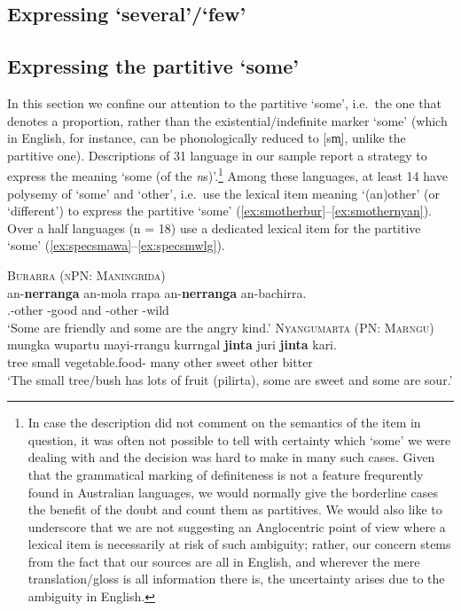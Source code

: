 \documentclass[12pt,egregdoesnotlikesansseriftitles]{scrartcl}
\begin{document}
 
 

\subsection{Expressing `several'/`few'}

\subsection{Expressing the partitive `some'}
\label{sec:some}
In this section we confine our attention to the partitive `some', i.e.\ the one that denotes a proportion, rather than the existential/indefinite marker `some' (which in English, for instance, can be phonologically reduced to [{\charis sm̩}], unlike the partitive one). Descriptions of 31 language in our sample report a strategy to express the meaning `some (of the \textit{n}s)'.\footnote{In case the description did not comment on the semantics of the item in question, it was often not possible to tell with certainty which `some' we were dealing with and the decision was hard to make in many such cases. Given that the grammatical marking of definiteness is not a feature frequrently found in Australian languages, we would normally give the borderline cases the benefit of the doubt and count them as partitives. We would also like to underscore that we are not suggesting an Anglocentric point of view where a lexical item is necessarily at risk of such ambiguity; rather, our concern stems from the fact that our sources are all in English, and wherever the mere translation/gloss is all information there is, the uncertainty arises due to the ambiguity in English.} %
Among these languages, at least 14 have polysemy of `some' and `other', i.e.\ use the lexical item meaning `(an)other' (or `different') to express the partitive `some' (\ref{ex:smotherbur}--\ref{ex:smothernyan}). Over a half languages (n = 18) use a dedicated lexical item for the partitive `some' (\ref{ex:specsmawa}--\ref{ex:specsmwlg}).
\begin{exe}
  \ex\label{ex:smotherbur} \textsc{Burarra (nPN: Maningrida)}\hfill {}\\
  \gll an-\textbf{nerranga} an-mola  rrapa  an-\textbf{nerranga}  an-bachirra.\\
  \Third.\Min-other \Third\Min-good and \Third\Min-other \Third\Min-wild\\
  \glt `Some are friendly and some are the angry kind.'
  \ex\label{ex:smothernyan} \textsc{Nyangumarta (PN: Marngu)}\hfill {}\\
  \gll mungka wupartu mayi-rrangu kurrngal \textbf{jinta} juri \textbf{jinta} kari.\\
  tree  small vegetable.food-\Pl{} many other sweet other bitter\\
  \glt `The small tree/bush has lots of fruit (pilirta), some are sweet and some are sour.'
\end{exe}
\end{document}
